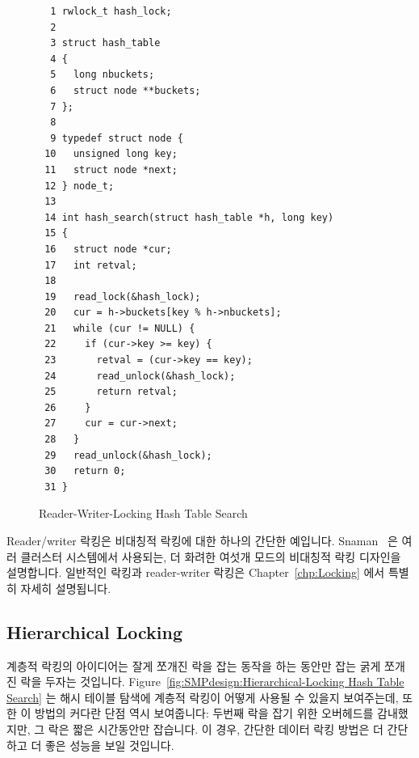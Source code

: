 \begin{figure}[htbp]
{ \scriptsize
\begin{verbatim}
  1 rwlock_t hash_lock;
  2
  3 struct hash_table
  4 {
  5   long nbuckets;
  6   struct node **buckets;
  7 };
  8
  9 typedef struct node {
 10   unsigned long key;
 11   struct node *next;
 12 } node_t;
 13
 14 int hash_search(struct hash_table *h, long key)
 15 {
 16   struct node *cur;
 17   int retval;
 18
 19   read_lock(&hash_lock);
 20   cur = h->buckets[key % h->nbuckets];
 21   while (cur != NULL) {
 22     if (cur->key >= key) {
 23       retval = (cur->key == key);
 24       read_unlock(&hash_lock);
 25       return retval;
 26     }
 27     cur = cur->next;
 28   }
 29   read_unlock(&hash_lock);
 30   return 0;
 31 }
\end{verbatim}
}
\caption{Reader-Writer-Locking Hash Table Search}
\label{fig:SMPdesign:Reader-Writer-Locking Hash Table Search}
\end{figure}

Reader/writer 락킹은 비대칭적 락킹에 대한 하나의 간단한 예입니다.
Snaman~\cite{Snaman87} 은 여러 클러스터 시스템에서 사용되는, 더 화려한 여섯개
모드의 비대칭적 락킹 디자인을 설명합니다.
일반적인 락킹과 reader-writer 락킹은 Chapter~\ref{chp:Locking} 에서 특별히
자세히 설명됩니다.

\subsection{Hierarchical Locking}
\label{sec:SMPdesign:Hierarchical Locking}

계층적 락킹의 아이디어는 잘게 쪼개진 락을 잡는 동작을 하는 동안만 잡는 굵게
쪼개진 락을 두자는 것입니다.
Figure~\ref{fig:SMPdesign:Hierarchical-Locking Hash Table Search}
는 해시 테이블 탐색에 계층적 락킹이 어떻게 사용될 수 있을지 보여주는데, 또한 이
방법의 커다란 단점 역시 보여줍니다:
두번째 락을 잡기 위한 오버헤드를 감내했지만, 그 락은 짧은 시간동안만 잡습니다.
이 경우, 간단한 데이터 락킹 방법은 더 간단하고 더 좋은 성능을 보일 것입니다.

